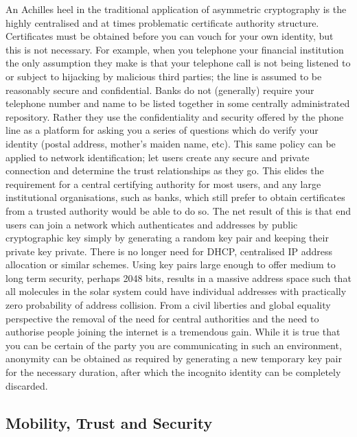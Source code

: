 \documentclass[british,english]{article}
\begin{document}
An Achilles heel in the traditional application of asymmetric cryptography
is the highly centralised and at times problematic certificate authority
structure. Certificates must be obtained before you can vouch for
your own identity, but this is not necessary. For example, when you
telephone your financial institution the only assumption they make
is that your telephone call is not being listened to or subject to
hijacking by malicious third parties; the line is assumed to be reasonably
secure and confidential. Banks do not (generally) require your telephone
number and name to be listed together in some centrally administrated
repository. Rather they use the confidentiality and security offered
by the phone line as a platform for asking you a series of questions
which do verify your identity (postal address, mother's maiden name,
etc). This same policy can be applied to network identification; let
users create any secure and private connection and determine the trust
relationships as they go. This elides the requirement for a central
certifying authority for most users, and any large institutional organisations,
such as banks, which still prefer to obtain certificates from a trusted
authority would be able to do so. The net result of this is that end
users can join a network which authenticates and addresses by public
cryptographic key simply by generating a random key pair and keeping
their private key private. There is no longer need for DHCP, centralised
IP address allocation or similar schemes. Using key pairs large enough
to offer medium to long term security, perhaps 2048 bits, results
in a massive address space such that all molecules in the solar system
could have individual addresses with practically zero probability
of address collision. From a civil liberties and global equality perspective
the removal of the need for central authorities and the need to authorise
people joining the internet is a tremendous gain. While it is true
that you can be certain of the party you are communicating in such
an environment, anonymity can be obtained as required by generating
a new temporary key pair for the necessary duration, after which the
incognito identity can be completely discarded.


\subsection{Mobility, Trust and Security}
\end{document}

